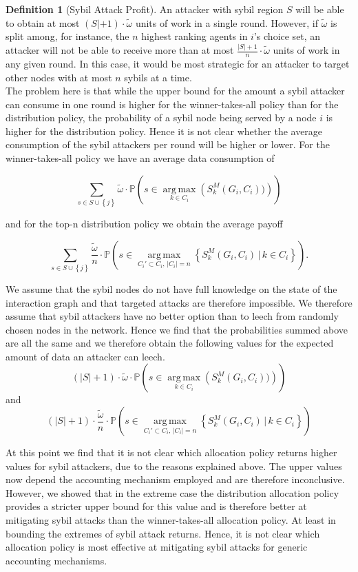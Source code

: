 \documentclass[11pt,a4paper]{report}
\theoremstyle{definition}
\newtheorem{definition}{Definition}[section]
\theoremstyle{theorem}
\theoremstyle{proposition}
\theoremstyle{corollary}
\theoremstyle{lemma}
\theoremstyle{example}
\theoremstyle{remark}
\DeclareMathOperator*{\argmax}{arg\,max}
\begin{document}
\begin{definition}[Sybil Attack Profit]
\noindent{}An attacker with sybil region $S$ will be able to obtain at most $(S|+1)\cdot{}\tilde{\omega}$ units of work in a single round. However, if $\tilde{\omega}$ is split among, for instance, the $n$ highest ranking agents in $i$'s choice set, an attacker will not be able to receive more than at most $\frac{|S|+1}{n}\cdot\tilde{\omega}$ units of work in any given round. In this case, it would be most strategic for an attacker to target other nodes with at most $n$ sybils at a time. \vspace{1em}\\ 

\noindent{}The problem here is that while the upper bound for the amount a sybil attacker can consume in one round is higher for the winner-takes-all policy than for the distribution policy, the probability of a sybil node being served by a node $i$ is higher for the distribution policy. Hence it is not clear whether the average consumption of the sybil attackers per round will be higher or lower. For the winner-takes-all policy we have an average data consumption of

\[
\sum\limits_{s\in{}S\cup\left\lbrace{}j\right\rbrace}\tilde{\omega}\cdot\mathbb{P}\left(s\in{}\argmax\limits_{k\in{}C_i}\left(S_k^M(G_i,C_i))\right)\right)
\] 

\noindent{}and for the top-n distribution policy we obtain the average payoff

\[
\sum\limits_{s\in{}S\cup\left\lbrace{}j\right\rbrace}\frac{\tilde{\omega}}{n}\cdot\mathbb{P}\left(s\in\argmax\limits_{C_i'\subset{}C_i,\,|C_i|=n}\left\lbrace{}S_k^M(G_i,C_i)\,|\,k\in{}C_i\right\rbrace\right).
\]

\noindent{}We assume that the sybil nodes do not have full knowledge on the state of the interaction graph and that targeted attacks are therefore impossible. We therefore assume that sybil attackers have no better option than to leech from randomly chosen nodes in the network. Hence we find that the probabilities summed above are all the same and we therefore obtain the following values for the expected amount of data an attacker can leech.
\[
(|S|+1)\cdot\tilde{\omega}\cdot\mathbb{P}\left(s\in{}\argmax\limits_{k\in{}C_i}\left(S_k^M(G_i,C_i))\right)\right)
\]
\noindent{}and
\[
(|S|+1)\cdot\frac{\tilde{\omega}}{n}\cdot\mathbb{P}\left(s\in\argmax\limits_{C_i'\subset{}C_i,\,|C_i|=n}\left\lbrace{}S_k^M(G_i,C_i)\,|\,k\in{}C_i\right\rbrace\right)
\]

\noindent{}At this point we find that it is not clear which allocation policy returns higher values for sybil attackers, due to the reasons explained above. The upper values now depend the accounting mechanism employed and are therefore inconclusive. However, we showed that in the extreme case the distribution allocation policy provides a stricter upper bound for this value and is therefore better at mitigating sybil attacks than the winner-takes-all allocation policy. At least in bounding the extremes of sybil attack returns. Hence, it is not clear which allocation policy is most effective at mitigating sybil attacks for generic accounting mechanisms.\vspace{1em}\\


\end{definition}
\end{document}
